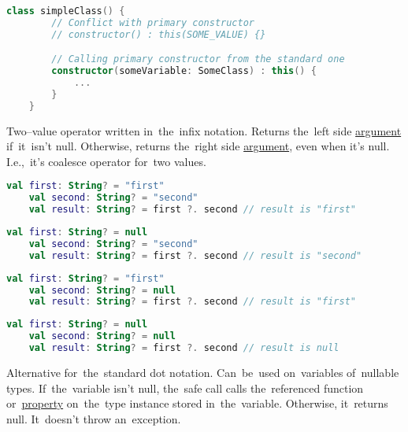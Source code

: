 \begin{lstlisting}[language=Kotlin]
    class simpleClass() {
        // Conflict with primary constructor
        // constructor() : this(SOME_VALUE) {}

        // Calling primary constructor from the standard one
        constructor(someVariable: SomeClass) : this() {
            ...
        }
    }
\end{lstlisting}
\newpage

Two--value operator written in~the~infix notation.
Returns the~left side \hyperref[parameterargument]{argument} if~it~isn't null.
Otherwise, returns the~right side \hyperref[parameterargument]{argument}, even when it's null.
I.e.,~it's coalesce operator for~two values.

\begin{lstlisting}[language=Kotlin]
    val first: String? = "first"
    val second: String? = "second"
    val result: String? = first ?. second // result is "first"
\end{lstlisting}

\begin{lstlisting}[language=Kotlin]
    val first: String? = null
    val second: String? = "second"
    val result: String? = first ?. second // result is "second"
\end{lstlisting}

\begin{lstlisting}[language=Kotlin]
    val first: String? = "first"
    val second: String? = null
    val result: String? = first ?. second // result is "first"
\end{lstlisting}

\begin{lstlisting}[language=Kotlin]
    val first: String? = null
    val second: String? = null
    val result: String? = first ?. second // result is null
\end{lstlisting}

\enlargethispage{20mm}
\thispagestyle{empty}
\label{kotlinsafecall}
Alternative for~the~standard dot notation.
Can~be~used on~variables of~nullable types.
If~the~variable isn't null, the~safe call calls the~referenced function or~\hyperref[variablefieldproperty]{property} on~the~type instance stored in~the~variable.
Otherwise, it~returns null.
It~doesn't throw an~exception.

